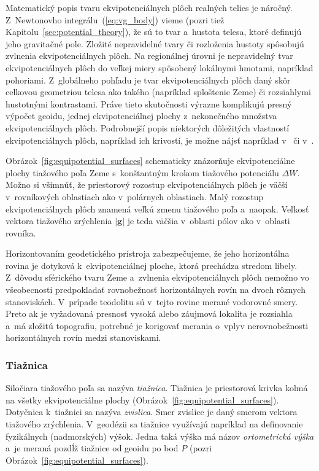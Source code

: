 \documentclass[a4paper, 12pt]{book}
\let\vec\mathbf
\begin{document}
Matematický popis tvaru ekvipotenciálnych plôch realných telies je náročný.  
Z~Newtonovho integrálu~(\ref{eq:vg_body}) vieme (pozri tiež 
Kapitolu~\ref{sec:potential_theory}), že sú to tvar a~hustota telesa, ktoré 
definujú jeho gravitačné pole.  Zložité nepravidelné tvary či rozloženia 
hustoty spôsobujú zvlnenia ekvipotenciálnych plôch.  Na regionálnej úrovni je 
nepravidelný tvar ekvipotenciálnych plôch do veľkej miery spôsobený lokálnymi 
hmotami, napríklad pohoriami.  Z~globálneho pohľadu je tvar ekvipotenciálnych 
plôch daný skôr celkovou geometriou telesa ako takého (napríklad sploštenie 
Zeme) či rozsiahlymi hustotnými kontrastami.  Práve tieto skutočnosti výrazne 
komplikujú presný výpočet geoidu, jednej ekvipotenciálnej plochy z~nekonečného 
množstva ekvipotenciálnych plôch.  Podrobnejší popis niektorých dôležitých 
vlastností ekvipotenciálnych plôch, napríklad ich krivostí, je možne nájsť 
napríklad v~\cite{Janak2006} či v~\cite{MoritzPhysicalGeodesy}.

Obrázok~\ref{fig:equipotential_surfaces} schematicky znázorňuje ekvipotenciálne 
plochy tiažového poľa Zeme s~konštantným krokom tiažového potenciálu $\Delta 
W$.  Možno si všimnúť, že priestorový rozostup ekvipotenciálnych plôch je väčší 
v~rovníkových oblastiach ako v~polárnych oblastiach.  Malý rozostup 
ekvipotenciálnych plôch znamená veľkú zmenu tiažového poľa a~naopak.  Veľkosť 
vektora tiažového zrýchlenia $| \vec g |$ je teda väčšia v~oblasti pólov ako 
v~oblasti rovníka.

Horizontovaním geodetického prístroja zabezpečujeme, že jeho horizontálna 
rovina je dotyková k~ekvipotenciálnej ploche, ktorá prechádza stredom libely.  
Z~dôvodu sférického tvaru Zeme a~zvlnenia ekvipotenciálnych plôch nemožno vo 
všeobecnosti predpokladať rovnobežnosť horizontálnych rovín na dvoch rôznych 
stanoviskách.  V~prípade teodolitu sú v~tejto rovine merané vodorovné smery.  
Preto ak je vyžadovaná presnosť vysoká alebo záujmová lokalita je rozsiahla 
a~má zložitú topografiu, potrebné je korigovať merania o~vplyv nerovnobežnosti 
horizontálnych rovín medzi stanoviskami.

\subsubsection{Tiažnica}

Siločiara tiažového poľa sa nazýva \emph{tiažnica}.  Tiažnica je priestorová 
krivka kolmá na všetky ekvipotenciálne plochy 
(Obrázok~\ref{fig:equipotential_surfaces}).  Dotyčnica k~tiažnici sa nazýva 
\emph{zvislica}.  Smer zvislice je daný smerom vektora tiažového zrýchlenia.  
V~geodézii sa tiažnice využívajú napríklad na definovanie fyzikálnych 
(nadmorských) výšok.  Jedna taká výška má názov \emph{ortometrická výška} a~je 
meraná pozdĺž tiažnice od geoidu po bod $P$ (pozri 
Obrázok~\ref{fig:equipotential_surfaces}).
\end{document}
